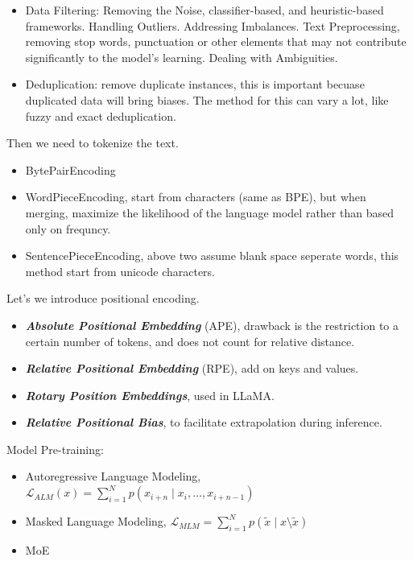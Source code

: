 \documentclass[10pt]{elegantbook}
\newcommand{\mydefination}[1]{\textbf{\textit{\textcolor{structurecolor}{#1}}}}
\begin{document}
\begin{itemize}
    \item Data Filtering: Removing the Noise, classifier-based, and heuristic-based frameworks. Handling Outliers. Addressing Imbalances. Text Preprocessing,
removing stop words, punctuation or other elements that may not contribute significantly to the model's learning. Dealing with Ambiguities.
    \item Deduplication: remove duplicate instances, this is important becuase duplicated data will bring biases. The method for this can vary a lot, like 
fuzzy and exact deduplication.
\end{itemize}

\vspace{\baselineskip}

Then we need to tokenize the text.
\begin{itemize}
    \item BytePairEncoding
    \item WordPieceEncoding, start from characters (same as BPE), but when merging, maximize the likelihood of the language model rather than based only on frequncy. 
    \item SentencePieceEncoding, above two assume blank space seperate words, this method start from unicode characters.
\end{itemize}

\vspace{\baselineskip}

Let's we introduce positional encoding.
\begin{itemize}
    \item \mydefination{Absolute Positional Embedding} (APE), drawback is the restriction to a certain number of tokens, and does not count for relative distance.
    \item \mydefination{Relative Positional Embedding} (RPE), add on keys and values.
    \item \mydefination{Rotary Position Embeddings}, used in LLaMA.
    \item \mydefination{Relative Positional Bias}, to facilitate extrapolation during inference.
\end{itemize}

\vspace{\baselineskip}

Model Pre-training:
\begin{itemize}
    \item Autoregressive Language Modeling, $\mathscr L_{ALM}(x) = \sum_{i=1}^N p(x_{i+n} \mid x_i, \ldots, x_{i+n-1})$
    \item Masked Language Modeling, $\mathscr L_{MLM} = \sum_{i=1}^N p(\tilde x \mid x \setminus \tilde x)$
    \item MoE
\end{itemize}
\end{document}
